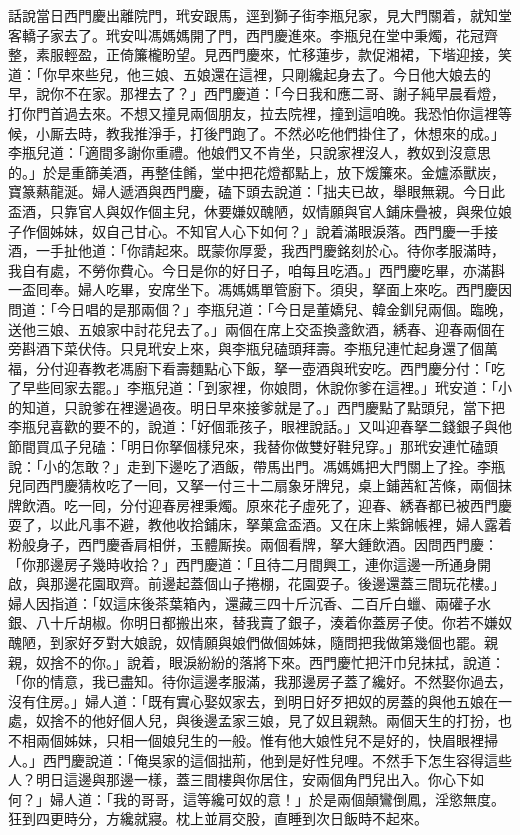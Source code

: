 話說當日西門慶出離院門，玳安跟馬，逕到獅子街李瓶兒家，見大門關着，{}就知堂客轎子家去了。玳安叫馮媽媽開了門，西門慶進來。李瓶兒在堂中秉燭，花冠齊整，素服輕盈，正倚簾櫳盼望。見西門慶來，忙移蓮步，款促湘裙，下堦迎接，笑道：「你早來些兒，他三娘、五娘還在這裡，只剛纔起身去了。今日他大娘去的早，說你不在家。那裡去了？」西門慶道：「今日我和應二哥、謝子純早晨看燈，打你門首過去來。不想又撞見兩個朋友，拉去院裡，撞到這咱晚。我恐怕你這裡等候，小厮去時，教我推淨手，打後門跑了。不然必吃他們掛住了，休想來的成。」李瓶兒道：「適間多謝你重禮。他娘們又不肯坐，只說家裡沒人，教奴到沒意思的。」於是重篩美酒，再整佳餚，堂中把花燈都點上，放下煖簾來。金爐添獸炭，寶篆爇龍涎。婦人遞酒與西門慶，磕下頭去說道：「拙夫已故，舉眼無親。今日此盃酒，只靠官人與奴作個主兒，休要嫌奴醜陋，奴情願與官人鋪床疊被，與衆位娘子作個姊妹，奴自己甘心。{}不知官人心下如何？」說着滿眼淚落。西門慶一手接酒，一手扯他道：「你請起來。既蒙你厚愛，我西門慶銘刻於心。待你孝服滿時，我自有處，不勞你費心。今日是你的好日子，咱每且吃酒。」西門慶吃畢，亦滿斟一盃囘奉。婦人吃畢，安席坐下。馮媽媽單管廚下。須臾，拏面上來吃。西門慶因問道：「今日唱的是那兩個？」李瓶兒道：「今日是董嬌兒、韓金釧兒兩個。臨晚，送他三娘、五娘家中討花兒去了。」兩個在席上交盃換盞飲酒，綉春、迎春兩個在旁斟酒下菜伏侍。只見玳安上來，與李瓶兒磕頭拜壽。李瓶兒連忙起身還了個萬福，分付迎春教老馮廚下看壽麵點心下飯，拏一壺酒與玳安吃。西門慶分付：「吃了早些囘家去罷。」李瓶兒道：「到家裡，你娘問，休說你爹在這裡。」玳安道：「小的知道，只說爹在裡邊過夜。明日早來接爹就是了。」西門慶點了點頭兒，{}當下把李瓶兒喜歡的要不的，說道：「好個乖孩子，眼裡說話。」又叫迎春拏二錢銀子與他節間買瓜子兒磕：「明日你拏個樣兒來，我替你做雙好鞋兒穿。」那玳安連忙磕頭說：「小的怎敢？」走到下邊吃了酒飯，帶馬出門。馮媽媽把大門關上了拴。李瓶兒同西門慶猜枚吃了一囘，又拏一付三十二扇象牙牌兒，桌上鋪茜紅苫條，兩個抹牌飲酒。吃一囘，分付迎春房裡秉燭。原來花子虛死了，迎春、綉春都已被西門慶耍了，以此凡事不避，教他收拾鋪床，拏菓盒盃酒。又在床上紫錦帳裡，婦人露着粉般身子，西門慶香肩相併，玉體厮挨。兩個看牌，拏大鍾飲酒。因問西門慶：「你那邊房子幾時收拾？」西門慶道：「且待二月間興工，連你這邊一所通身開啟，與那邊花園取齊。前邊起蓋個山子捲棚，花園耍子。後邊還蓋三間玩花樓。」婦人因指道：「奴這床後茶葉箱內，還藏三四十斤沉香、二百斤白蠟、兩礶子水銀、八十斤胡椒。你明日都搬出來，替我賣了銀子，湊着你蓋房子使。你若不嫌奴醜陋，到家好歹對大娘說，奴情願與娘們做個姊妹，隨問把我做第幾個也罷。親親，奴捨不的你。」{}說着，眼淚紛紛的落將下來。西門慶忙把汗巾兒抹拭，{}說道：「你的情意，我已盡知。待你這邊孝服滿，我那邊房子蓋了纔好。不然娶你過去，沒有住房。」婦人道：「既有實心娶奴家去，到明日好歹把奴的房蓋的與他五娘在一處，奴捨不的他好個人兒，{}與後邊孟家三娘，見了奴且親熱。兩個天生的打扮，也不相兩個姊妹，只相一個娘兒生的一般。{}惟有他大娘性兒不是好的，快眉眼裡掃人。」西門慶說道：「俺吳家的這個拙荊，他到是好性兒哩。{}不然手下怎生容得這些人？明日這邊與那邊一樣，蓋三間樓與你居住，安兩個角門兒出入。你心下如何？」婦人道：「我的哥哥，這等纔可奴的意！」於是兩個顛鸞倒鳳，淫慾無度。狂到四更時分，方纔就寢。枕上並肩交股，直睡到次日飯時不起來。

